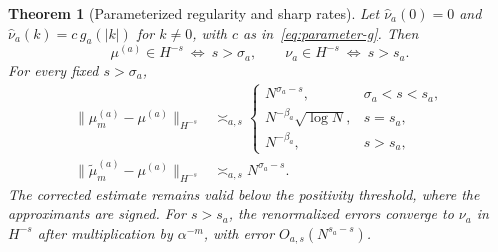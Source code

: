\documentclass[11pt,a4paper]{article}
\numberwithin{equation}{section}
\newtheorem{theorem}{Theorem}[section]
\theoremstyle{definition}
\theoremstyle{remark}
\newcommand{\mt}{\widetilde\mu}
\newcommand{\norm}[1]{\lVert #1\rVert}
\begin{document}
\begin{theorem}[Parameterized regularity and sharp rates]
\label{thm:parameter-rates}
Let $\widehat\nu_a(0)=0$ and
$\widehat\nu_a(k)=c\,g_a(|k|)$ for $k\ne0$, with $c$ as
in~\eqref{eq:parameter-g}. Then
\begin{equation}
 \mu^{(a)}\in H^{-s}\ \Longleftrightarrow\ s>\sigma_a,
 \qquad \nu_a\in H^{-s}\ \Longleftrightarrow\ s>s_a.
 \label{eq:param-reg}
\end{equation}
For every fixed $s>\sigma_a$,
\begin{align}
 \norm{\mu_m^{(a)}-\mu^{(a)}}_{H^{-s}}
 &\asymp_{a,s}
 \begin{cases}
 N^{\sigma_a-s},&\sigma_a<s<s_a,\\
 N^{-\beta_a}\sqrt{\log N},&s=s_a,\\
 N^{-\beta_a},&s>s_a,
 \end{cases}\label{eq:param-raw}\\
 \norm{\mt_m^{(a)}-\mu^{(a)}}_{H^{-s}}
 &\asymp_{a,s}N^{\sigma_a-s}.
 \label{eq:param-corrected}
\end{align}
The corrected estimate remains valid below the positivity threshold, where the
approximants are signed. For $s>s_a$, the renormalized errors converge to
$\nu_a$ in $H^{-s}$ after multiplication by $\alpha^{-m}$, with error
$O_{a,s}(N^{s_a-s})$.
\end{theorem}
\end{document}
